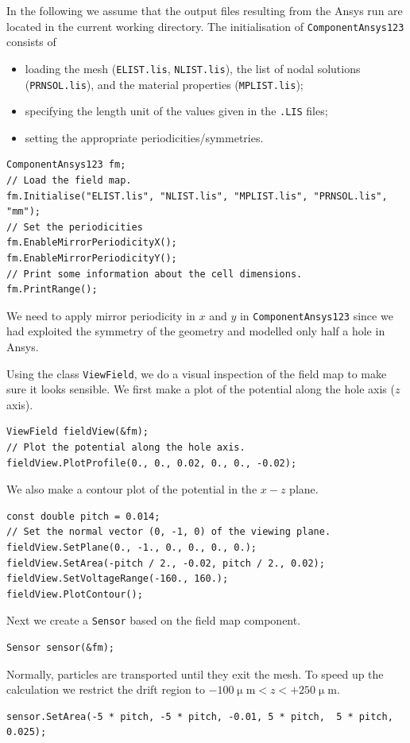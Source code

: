 In the following we assume that the output files resulting from the 
Ansys run are located in the current working directory.
The initialisation of \texttt{ComponentAnsys123} consists of 
\begin{itemize}
  \item
  loading the mesh (\texttt{ELIST.lis}, \texttt{NLIST.lis}), 
  the list of nodal solutions (\texttt{PRNSOL.lis}), and the 
  material properties (\texttt{MPLIST.lis});
  \item
  specifying the length unit of the values given in the 
  \texttt{.LIS} files;
  \item
  setting the appropriate periodicities/symmetries.
\end{itemize}
\begin{lstlisting}
ComponentAnsys123 fm;
// Load the field map.
fm.Initialise("ELIST.lis", "NLIST.lis", "MPLIST.lis", "PRNSOL.lis", "mm");
// Set the periodicities
fm.EnableMirrorPeriodicityX();
fm.EnableMirrorPeriodicityY();
// Print some information about the cell dimensions.
fm.PrintRange();
\end{lstlisting}
We need to apply mirror periodicity in $x$ and $y$
in \texttt{ComponentAnsys123} since we had exploited the symmetry 
of the geometry and modelled only half a hole in Ansys.

Using the class \texttt{ViewField}, we do a visual inspection of the 
field map to make sure it looks sensible.
We first make a plot of the potential along the hole axis ($z$ axis).
\begin{lstlisting}
ViewField fieldView(&fm);
// Plot the potential along the hole axis.
fieldView.PlotProfile(0., 0., 0.02, 0., 0., -0.02);
\end{lstlisting}
We also make a contour plot of the potential in the $x - z$ plane.
\begin{lstlisting}
const double pitch = 0.014;
// Set the normal vector (0, -1, 0) of the viewing plane.
fieldView.SetPlane(0., -1., 0., 0., 0., 0.);
fieldView.SetArea(-pitch / 2., -0.02, pitch / 2., 0.02);
fieldView.SetVoltageRange(-160., 160.);
fieldView.PlotContour();
\end{lstlisting}
Next we create a \texttt{Sensor} based on the field map component.
\begin{lstlisting}
Sensor sensor(&fm);
\end{lstlisting}
Normally, particles are transported until they exit the mesh. 
To speed up the calculation we restrict the drift region to 
$-100\upmu\text{m} < z < +250\upmu\text{m}$.
\begin{lstlisting}
sensor.SetArea(-5 * pitch, -5 * pitch, -0.01, 5 * pitch,  5 * pitch,  0.025);
\end{lstlisting}
